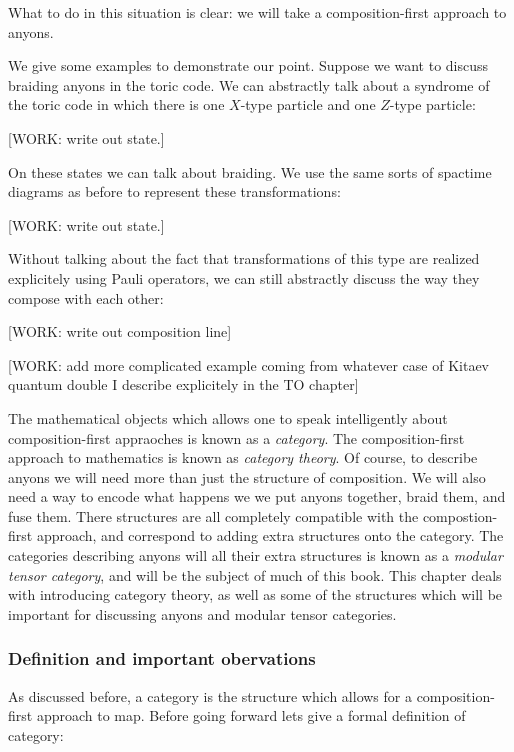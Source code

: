 \documentclass{article}
\theoremstyle{definition}
\numberwithin{figure}{section}
\begin{document}
What to do in this situation is clear: we will take a composition-first approach to anyons.

We give some examples to demonstrate our point. Suppose we want to discuss braiding anyons in the toric code. We can abstractly talk about a syndrome of the toric code in which there is one $X$-type particle and one $Z$-type particle:

[WORK: write out state.]

On these states we can talk about braiding. We use the same sorts of spactime diagrams as before to represent these transformations:

[WORK: write out state.]

Without talking about the fact that transformations of this type are realized explicitely using Pauli operators, we can still abstractly discuss the way they compose with each other:

[WORK: write out composition line]

[WORK: add more complicated example coming from whatever case of Kitaev quantum double I describe explicitely in the TO chapter]

The mathematical objects which allows one to speak intelligently about composition-first appraoches is known as a \textit{category}. The composition-first approach to mathematics is known as \textit{category theory}. Of course, to describe anyons we will need more than just the structure of composition. We will also need a way to encode what happens we we put anyons together, braid them, and fuse them. There structures are all completely compatible with the compostion-first approach, and correspond to adding extra structures onto the category. The categories describing anyons will all their extra structures is known as a \textit{modular tensor category}, and will be the subject of much of this book. This chapter deals with introducing category theory, as well as some of the structures which will be important for discussing anyons and modular tensor categories.

\subsubsection{Definition and important obervations}

As discussed before, a category is the structure which allows for a composition-first approach to map. Before going forward lets give a formal definition of category:
\end{document}
